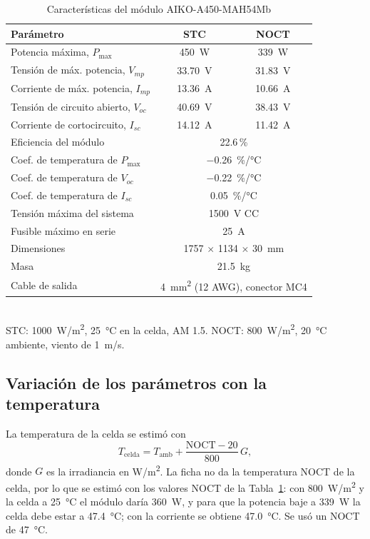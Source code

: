 \begin{table}[!htb]
\caption{Características del módulo AIKO-A450-MAH54Mb \cite{aiko_ds}}
\label{tab:modulo}
\centering
\footnotesize
\setlength{\tabcolsep}{3pt}
\begin{tabular}{l c c}
\toprule
Parámetro & STC & NOCT \\
\midrule
Potencia máxima, $P_{\max}$ & \SI{450}{W} & \SI{339}{W} \\
Tensión de máx. potencia, $V_{mp}$ & \SI{33.70}{V} & \SI{31.83}{V} \\
Corriente de máx. potencia, $I_{mp}$ & \SI{13.36}{A} & \SI{10.66}{A} \\
Tensión de circuito abierto, $V_{oc}$ & \SI{40.69}{V} & \SI{38.43}{V} \\
Corriente de cortocircuito, $I_{sc}$ & \SI{14.12}{A} & \SI{11.42}{A} \\
\midrule
Eficiencia del módulo & \multicolumn{2}{c}{22.6\,\%} \\
Coef. de temperatura de $P_{\max}$ & \multicolumn{2}{c}{\SI{-0.26}{\%/\celsius}} \\
Coef. de temperatura de $V_{oc}$ & \multicolumn{2}{c}{\SI{-0.22}{\%/\celsius}} \\
Coef. de temperatura de $I_{sc}$ & \multicolumn{2}{c}{\SI[retain-explicit-plus]{+0.05}{\%/\celsius}} \\
Tensión máxima del sistema & \multicolumn{2}{c}{\SI{1500}{V} CC} \\
Fusible máximo en serie & \multicolumn{2}{c}{\SI{25}{A}} \\
Dimensiones & \multicolumn{2}{c}{\SI{1757}{} $\times$ \SI{1134}{} $\times$ \SI{30}{mm}} \\
Masa & \multicolumn{2}{c}{\SI{21.5}{kg}} \\
Cable de salida & \multicolumn{2}{c}{\SI{4}{mm^2} (12 AWG), conector MC4} \\
\bottomrule
\end{tabular}
\\[2pt]
{\footnotesize STC: \SI{1000}{W/m^2}, \SI{25}{\celsius} en la celda, AM 1.5. NOCT: \SI{800}{W/m^2}, \SI{20}{\celsius} ambiente, viento de \SI{1}{m/s}.}
\end{table}

\subsection{Variación de los parámetros con la temperatura}

La temperatura de la celda se estimó con
\begin{equation}
T_{\mathrm{celda}} = T_{\mathrm{amb}} + \frac{\mathrm{NOCT}-20}{800}\,G,
\label{eq:tcelda}
\end{equation}
donde $G$ es la irradiancia en \si{W/m^2}. La ficha no da la temperatura NOCT de la celda, por lo que se estimó con los valores NOCT de la Tabla~\ref{tab:modulo}: con \SI{800}{W/m^2} y la celda a \SI{25}{\celsius} el módulo daría \SI{360}{W}, y para que la potencia baje a \SI{339}{W} la celda debe estar a \SI{47.4}{\celsius}; con la corriente se obtiene \SI{47.0}{\celsius}. Se usó un NOCT de \SI{47}{\celsius}.

